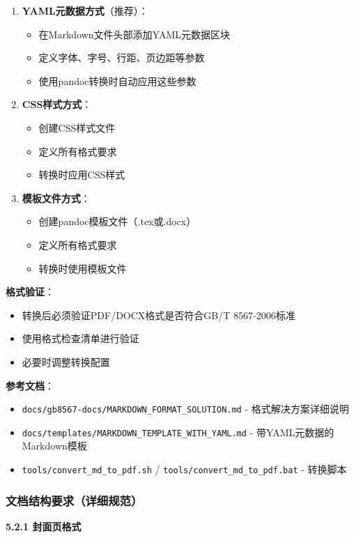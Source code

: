\documentclass[12pt,a4paper]{article}
\numberwithin{equation}{section}  %
\begin{document}
\begin{enumerate}
\item \textbf{YAML元数据方式}（推荐）：
\begin{itemize}
\item 在Markdown文件头部添加YAML元数据区块
\item 定义字体、字号、行距、页边距等参数
\item 使用pandoc转换时自动应用这些参数

\end{itemize}
\item \textbf{CSS样式方式}：
\begin{itemize}
\item 创建CSS样式文件
\item 定义所有格式要求
\item 转换时应用CSS样式

\end{itemize}
\item \textbf{模板文件方式}：
\begin{itemize}
\item 创建pandoc模板文件（.tex或.docx）
\item 定义所有格式要求
\item 转换时使用模板文件
\end{itemize}
\end{enumerate}

\textbf{格式验证}：
\begin{itemize}
\item 转换后必须验证PDF/DOCX格式是否符合GB/T 8567-2006标准
\item 使用格式检查清单进行验证
\item 必要时调整转换配置
\end{itemize}

\textbf{参考文档}：
\begin{itemize}
\item \texttt{docs/gb8567-docs/MARKDOWN\_FORMAT\_SOLUTION.md} - 格式解决方案详细说明
\item \texttt{docs/templates/MARKDOWN\_TEMPLATE\_WITH\_YAML.md} - 带YAML元数据的Markdown模板
\item \texttt{tools/convert\_md\_to\_pdf.sh} / \texttt{tools/convert\_md\_to\_pdf.bat} - 转换脚本
\end{itemize}

\subsubsection{文档结构要求（详细规范）}
\textbf{5.2.1 封面页格式}
\end{document}
